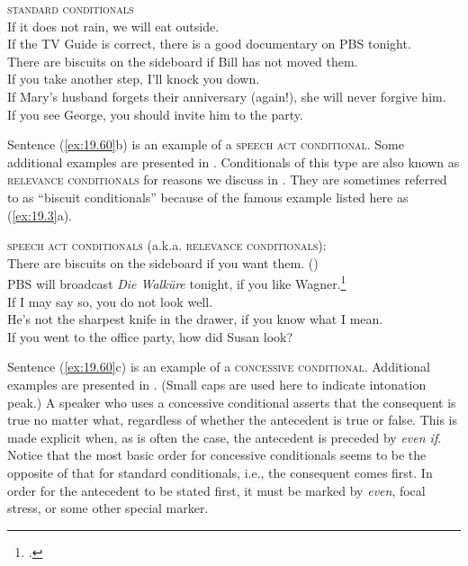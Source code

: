 \ea \label{ex:19.2}
\textsc{standard conditionals}\\
\ea  If it does not rain, we will eat outside.\\
\ex If the TV Guide is correct, there is a good documentary on PBS tonight.\\
\ex There are biscuits on the sideboard if Bill has not moved them.\\
\ex If you take another step, I’ll knock you down.\\
\ex If Mary’s husband forgets their anniversary (again!), she will never forgive him.\\
\ex If you see George, you should invite him to the party.
                       \z
\z


Sentence (\ref{ex:19.60}b) is an example of a \textsc{speech act conditional}. Some additional examples are presented in . Conditionals of this type are also known as \textsc{relevance conditionals} for reasons we discuss in . They are sometimes referred to as “biscuit conditionals” because of the famous example listed here as (\ref{ex:19.3}a).


\ea \label{ex:19.3}
\textsc{speech act conditionals} (a.k.a. \textsc{relevance conditionals}):\\
\ea  There are biscuits on the sideboard if you want them.  (\citealt{Austin1956})\\
\ex PBS will broadcast \textit{Die Walküre} tonight, if you like Wagner.\footnote{\citet{Bennett2003}.}\\
\ex If I may say so, you do not look well.\\
\ex He’s not the sharpest knife in the drawer, if you know what I mean.\\
\ex If you went to the office party, how did Susan look?
                       \z
\z


Sentence (\ref{ex:19.60}c) is an example of a \textsc{concessive conditional}. Additional examples are presented in . (Small caps are used here to indicate intonation peak.) A speaker who uses a concessive conditional asserts that the consequent is true no matter what, regardless of whether the antecedent is true or false. This is made explicit when, as is often the case, the antecedent is preceded by \textit{even if}. Notice that the most basic order for concessive conditionals seems to be the opposite of that for standard conditionals, i.e., the consequent comes first. In order for the antecedent to be stated first, it must be marked by \textit{even}, focal stress, or some other special marker.



